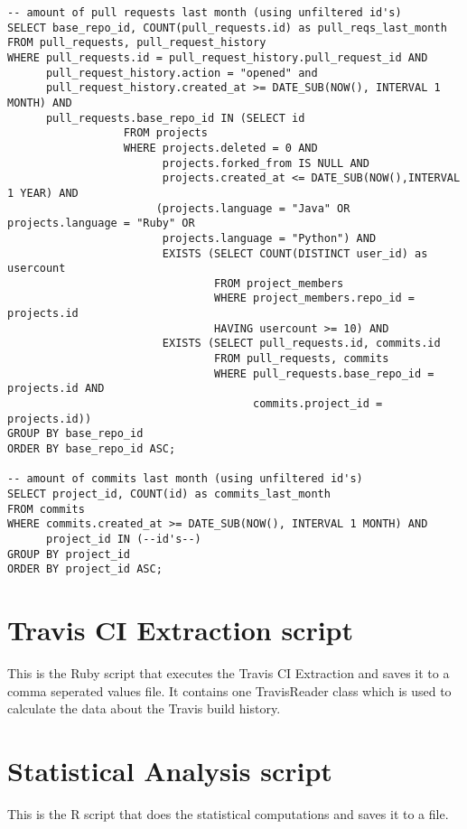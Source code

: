 \documentclass[a4paper,11pt]{article}
\begin{document}
{\begin{verbatim}
-- amount of pull requests last month (using unfiltered id's)
SELECT base_repo_id, COUNT(pull_requests.id) as pull_reqs_last_month 
FROM pull_requests, pull_request_history 
WHERE pull_requests.id = pull_request_history.pull_request_id AND 
      pull_request_history.action = "opened" and 
      pull_request_history.created_at >= DATE_SUB(NOW(), INTERVAL 1 MONTH) AND 
      pull_requests.base_repo_id IN (SELECT id 
                  FROM projects 
                  WHERE projects.deleted = 0 AND 
                        projects.forked_from IS NULL AND 
                        projects.created_at <= DATE_SUB(NOW(),INTERVAL 1 YEAR) AND 
                       (projects.language = "Java" OR projects.language = "Ruby" OR 
                        projects.language = "Python") AND 
                        EXISTS (SELECT COUNT(DISTINCT user_id) as usercount 
                                FROM project_members 
                                WHERE project_members.repo_id = projects.id 
                                HAVING usercount >= 10) AND 
                        EXISTS (SELECT pull_requests.id, commits.id 
                                FROM pull_requests, commits 
                                WHERE pull_requests.base_repo_id = projects.id AND 
                                      commits.project_id = projects.id)) 
GROUP BY base_repo_id 
ORDER BY base_repo_id ASC;

-- amount of commits last month (using unfiltered id's)
SELECT project_id, COUNT(id) as commits_last_month 
FROM commits 
WHERE commits.created_at >= DATE_SUB(NOW(), INTERVAL 1 MONTH) AND 
      project_id IN (--id's--) 
GROUP BY project_id 
ORDER BY project_id ASC;
	\end{verbatim}
	}
	
	\section{Travis CI Extraction script}
	\label{app:ci-extraction}
	This is the Ruby script that executes the Travis CI Extraction and saves it to a comma seperated values file.
	It contains one TravisReader class which is used to calculate the data about the Travis build history.
	
	{\scriptsize 
		
		
	}
	
	\section{Statistical Analysis script}
	\label{app:r}
	This is the R script that does the statistical computations and saves it to a file.
	{\scriptsize
	   
	}
	
\end{document}
